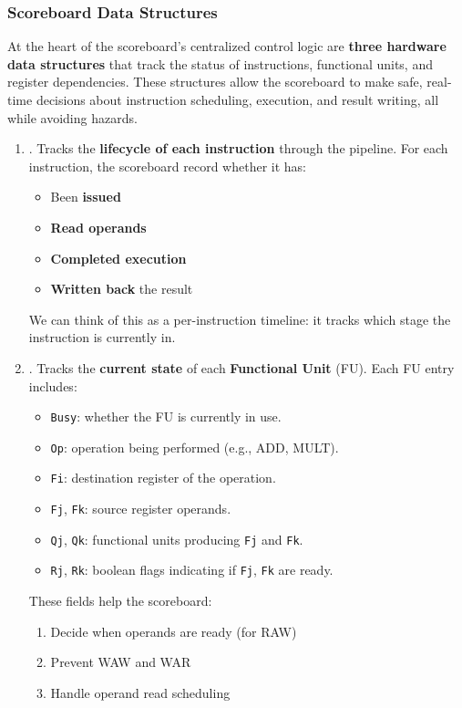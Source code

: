 \subsubsection{Scoreboard Data Structures}\label{subsubsection: Scoreboard Data Structures}

At the heart of the scoreboard's centralized control logic are \textbf{three hardware data structures} that track the status of instructions, functional units, and register dependencies. These structures allow the scoreboard to make safe, real-time decisions about instruction scheduling, execution, and result writing, all while avoiding hazards.
\begin{enumerate}
    \item {}. Tracks the \textbf{lifecycle of each instruction} through the pipeline. For each instruction, the scoreboard record whether it has:
    \begin{itemize}
        \item Been \textbf{issued}
        \item \textbf{Read operands}
        \item \textbf{Completed execution}
        \item \textbf{Written back} the result
    \end{itemize}
    We can think of this as a per-instruction timeline: it tracks which stage the instruction is currently in.

    \item {}. Tracks the \textbf{current state} of each \textbf{Functional Unit} (FU). Each FU entry includes:
    \begin{itemize}
        \item \texttt{Busy}: whether the FU is currently in use.
        \item \texttt{Op}: operation being performed (e.g., ADD, MULT).
        \item \texttt{Fi}: destination register of the operation.
        \item \texttt{Fj}, \texttt{Fk}: source register operands.
        \item \texttt{Qj}, \texttt{Qk}: functional units producing \texttt{Fj} and \texttt{Fk}.
        \item \texttt{Rj}, \texttt{Rk}: boolean flags indicating if \texttt{Fj}, \texttt{Fk} are ready.
    \end{itemize}
    These fields help the scoreboard:
    \begin{enumerate}
        \item Decide when operands are ready (for RAW)
        \item Prevent WAW and WAR
        \item Handle operand read scheduling
    \end{enumerate}


\end{enumerate}

